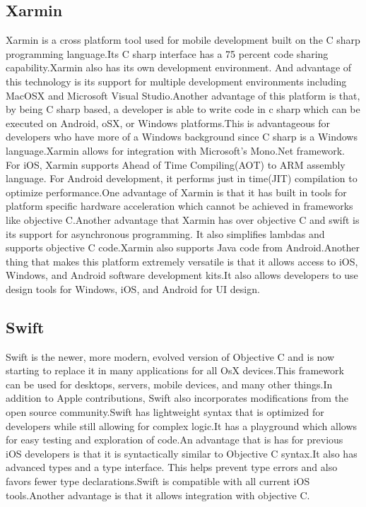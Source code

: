 \documentclass[onecolumn, draftclsnofoot,10pt, compsoc]{IEEEtran}
\begin{document}
    \subsection{Xarmin}
    Xarmin is a cross platform tool used for mobile development built on the C sharp programming language.\cite{Xarmin}Its C sharp interface has a 75 percent code sharing capability.Xarmin also has its own development environment. And advantage of this technology is its support for multiple development environments including MacOSX and Microsoft Visual Studio.Another advantage of this platform is that, by being C sharp based, a developer is able to write code in c sharp which can be executed on Android, oSX, or Windows platforms.This is advantageous for developers who have more of a Windows background since C sharp is a Windows language.Xarmin allows for integration with Microsoft's Mono.Net framework. For iOS, Xarmin supports Ahead of Time Compiling(AOT) to ARM assembly language. For Android development, it performs just in time(JIT) compilation to optimize performance.One advantage of Xarmin is that it has built in tools for platform specific hardware acceleration which cannot be achieved in frameworks like objective C.Another advantage that Xarmin has over objective C and swift is its support for asynchronous programming. It also simplifies lambdas and supports objective C code.Xarmin also supports Java code from Android.Another thing that makes this platform extremely versatile is that it allows access to iOS, Windows, and Android software development kits.It also allows developers to use design tools for Windows, iOS, and Android for UI design.
    \subsection{Swift}
     Swift is the newer, more modern, evolved version of Objective C and is now starting to replace it in many applications for all OsX devices.\cite{Swift}This framework can be used for desktops, servers, mobile devices, and many other things.In addition to Apple contributions, Swift also incorporates modifications from the open source community.Swift has lightweight syntax that is optimized for developers while still allowing for complex logic.It has a playground which allows for easy testing and exploration of code.An advantage that is has for previous iOS developers is that it is syntactically similar to Objective C syntax.It also has advanced types  and a type interface. This helps prevent type errors and also favors fewer type declarations.Swift is compatible with all current iOS tools.Another advantage is that it allows integration with objective C.
\end{document}
